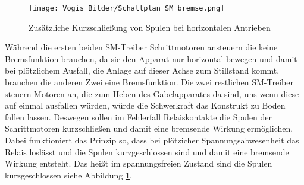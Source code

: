     \begin{figure}[h]
        \centering
        \texttt{[image: Vogis Bilder/Schaltplan\_SM\_bremse.png]}
        \caption{Zusätzliche Kurzschließung von Spulen bei horizontalen Antrieben}
        \label{fig:SMmitBremse}
    \end{figure}
    Während die ersten beiden SM-Treiber Schrittmotoren ansteuern die keine Bremsfunktion brauchen, da sie den Apparat nur horizontal bewegen und damit bei plötzlichem Ausfall, die Anlage auf dieser Achse zum Stillstand kommt, brauchen die anderen Zwei eine Bremsfunktion. Die zwei restlichen SM-Treiber steuern Motoren an, die zum Heben des Gabelapparates da sind, uns wenn diese auf einmal ausfallen würden, würde die Schwerkraft das Konstrukt zu Boden fallen lassen. Deswegen sollen im Fehlerfall Relaiskontakte die Spulen der Schrittmotoren kurzschließen und damit eine bremsende Wirkung ermöglichen. Dabei funktioniert das Prinzip so, dass bei plötzicher Spannungsabwesenheit das Relais loslässt und die Spulen kurzgeschlossen sind und damit eine bremsende Wirkung entsteht. Das heißt im spannungsfreien Zustand sind die Spulen kurzgeschlossen siehe Abbildung \ref{fig:SMmitBremse}.
